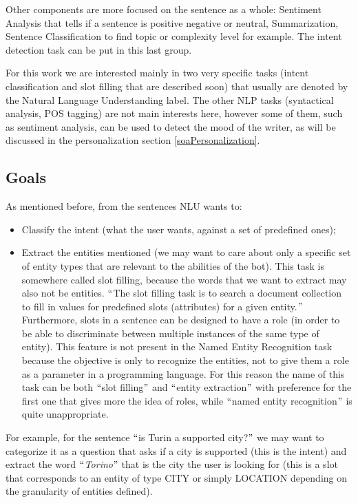 Other components are more focused on the sentence as a whole: Sentiment Analysis that tells if a sentence is positive negative or neutral, Summarization, Sentence Classification to find topic or complexity level for example. The intent detection task can be put in this last group.

For this work we are interested mainly in two very specific tasks (intent classification and slot filling that are described soon) that usually are denoted by the Natural Language Understanding label. The other NLP tasks (syntactical analysis, POS tagging) are not main interests here, however some of them, such as sentiment analysis, can be used to detect the mood of the writer, as will be discussed in the personalization section \ref{soaPersonalization}.

\subsection{Goals}
As mentioned before, from the sentences NLU wants to:

\begin{itemize}
	\item Classify the intent (what the user wants, against a set of predefined ones);

	\item Extract the entities mentioned (we may want to care about only a specific set of entity types that are relevant to the abilities of the bot). This task is somewhere called slot filling, because the words that we want to extract may also not be entities. $``$The slot filling task is to search a document collection to fill in values for predefined slots (attributes) for a given entity.$"$  Furthermore, slots in a sentence can be designed to have a role (in order to be able to discriminate between multiple instances of the same type of entity). This feature is not present in the Named Entity Recognition task because the objective is only to recognize the entities, not to give them a role as a parameter in a programming language. For this reason the name of this task can be both $``$slot filling$"$  and $``$entity extraction$"$  with preference for the first one that gives more the idea of roles, while $``$named entity recognition$"$  is quite unappropriate.
\end{itemize}

For example, for the sentence $``$is Turin a supported city?$"$  we may want to categorize it as a question that asks if a city is supported (this is the intent) and extract the word $``$\textit{Torino}$"$  that is the city the user is looking for (this is a slot that corresponds to an entity of type CITY or simply LOCATION depending on the granularity of entities defined).

